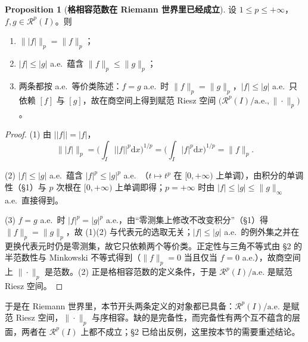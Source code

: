 \documentclass[oneside]{book}
\theoremstyle{definition}
\newcommand{\Rc}{\mathcal{R}}
\newcommand{\dd}{\mathrm{d}}
\theoremstyle{definition}
\newtheorem{proposition}{Proposition}[section]
\begin{document}
	\begin{proposition}[\bfseries{格相容范数在 Riemann 世界里已经成立}]
		设 $1\leqslant p\leqslant+\infty$，$f,g\in\Rc^{p}(I)$。则
		\begin{enumerate}[label=(\arabic*),leftmargin=2.2em,itemsep=0.1em,topsep=0.3em]
			\item $\big\||f|\big\|_{p}=\|f\|_{p}$；
			\item $|f|\leqslant|g|$ a.e.\ 蕴含 $\|f\|_{p}\leqslant\|g\|_{p}$；
			\item 两条都按 a.e.\ 等价类陈述：$f=g$ a.e.\ 时 $\|f\|_{p}=\|g\|_{p}$，$|f|\leqslant|g|$ a.e.\ 只依赖 $[f]$ 与 $[g]$，故在商空间上得到赋范 Riesz 空间 $\big(\Rc^{p}(I)/\mathrm{a.e.},\|\cdot\|_{p}\big)$。
		\end{enumerate}
	\end{proposition}
	
	\begin{proof}
		(1) 由 $\big||f|\big|=|f|$，
		\[
		\big\||f|\big\|_{p}=\Big(\int_{I}\big||f|\big|^{p}\dd x\Big)^{1/p}=\Big(\int_{I}|f|^{p}\dd x\Big)^{1/p}=\|f\|_{p}.
		\]
		
		(2) $|f|\leqslant|g|$ a.e.\ 蕴含 $|f|^{p}\leqslant|g|^{p}$ a.e.\ （$t\mapsto t^{p}$ 在 $[0,+\infty)$ 上单调），由积分的单调性（\S 1）与 $p$ 次根在 $[0,+\infty)$ 上单调即得；$p=+\infty$ 时由 $|f|\leqslant|g|\leqslant\|g\|_{\infty}$ a.e.\ 直接得到。
		
		(3) $f=g$ a.e.\ 时 $|f|^{p}=|g|^{p}$ a.e.，由“零测集上修改不改变积分”（\S 1）得 $\|f\|_{p}=\|g\|_{p}$，故 (1)(2) 与代表元的选取无关；$|f|\leqslant|g|$ a.e.\ 的例外集之并在更换代表元时仍是零测集，故它只依赖两个等价类。正定性与三角不等式由 \S 2 的半范数性与 Minkowski 不等式得到（$\|f\|_{p}=0$ 当且仅当 $f=0$ a.e.），故商空间上 $\|\cdot\|_{p}$ 是范数。(2) 正是格相容范数的定义条件，于是 $\Rc^{p}(I)/\mathrm{a.e.}$ 是赋范 Riesz 空间。
	\end{proof}
	
	于是在 Riemann 世界里，本节开头两条定义的对象都已具备：$\Rc^{p}(I)/\mathrm{a.e.}$ 是赋范 Riesz 空间，$\|\cdot\|_{p}$ 与序相容。缺的是完备性，而完备性有两个互不蕴含的层面，两者在 $\Rc^{p}(I)$ 上都不成立；\S 2 已给出反例，这里按本节的需要重述结论。
	
\end{document}
